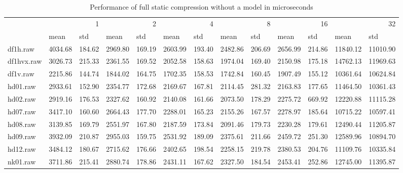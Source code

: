 \begin{table}
\caption{Performance of full static compression without a model in microseconds}
\begin{tabular}{lllllllllllll}
 & \multicolumn{2}{r}{1} & \multicolumn{2}{r}{2} & \multicolumn{2}{r}{4} & \multicolumn{2}{r}{8} & \multicolumn{2}{r}{16} & \multicolumn{2}{r}{32} \\
 & mean & std & mean & std & mean & std & mean & std & mean & std & mean & std \\
df1h.raw & 4034.68 & 184.62 & 2969.80 & 169.19 & 2603.99 & 193.40 & 2482.86 & 206.69 & 2656.99 & 214.86 & 11840.12 & 11010.90 \\
df1hvx.raw & 3026.73 & 215.33 & 2361.55 & 169.52 & 2052.58 & 158.63 & 1974.04 & 169.40 & 2150.98 & 175.18 & 14762.13 & 11969.63 \\
df1v.raw & 2215.86 & 144.74 & 1844.02 & 164.75 & 1702.35 & 158.53 & 1742.84 & 160.45 & 1907.49 & 155.12 & 10361.64 & 10624.84 \\
hd01.raw & 2933.61 & 152.90 & 2354.77 & 172.68 & 2169.67 & 167.81 & 2114.45 & 281.32 & 2163.83 & 177.65 & 11464.50 & 10361.43 \\
hd02.raw & 2919.16 & 176.53 & 2327.62 & 160.92 & 2140.08 & 161.66 & 2073.50 & 178.29 & 2275.72 & 669.92 & 12220.88 & 11115.28 \\
hd07.raw & 3417.10 & 160.60 & 2664.43 & 177.70 & 2288.01 & 165.23 & 2155.26 & 167.57 & 2278.97 & 185.64 & 10715.22 & 10597.41 \\
hd08.raw & 3139.85 & 169.79 & 2551.97 & 167.80 & 2187.59 & 173.84 & 2091.46 & 179.73 & 2230.28 & 179.61 & 12490.44 & 11205.87 \\
hd09.raw & 3932.09 & 210.87 & 2955.03 & 159.75 & 2531.92 & 189.09 & 2375.61 & 211.66 & 2459.72 & 251.30 & 12589.96 & 10894.70 \\
hd12.raw & 3484.12 & 180.67 & 2715.62 & 176.66 & 2402.65 & 198.54 & 2258.15 & 219.78 & 2380.53 & 204.76 & 11109.76 & 10335.84 \\
nk01.raw & 3711.86 & 215.41 & 2880.74 & 178.86 & 2431.11 & 167.62 & 2327.50 & 184.54 & 2453.41 & 252.86 & 12745.00 & 11395.87 \\
\end{tabular}
\end{table}
